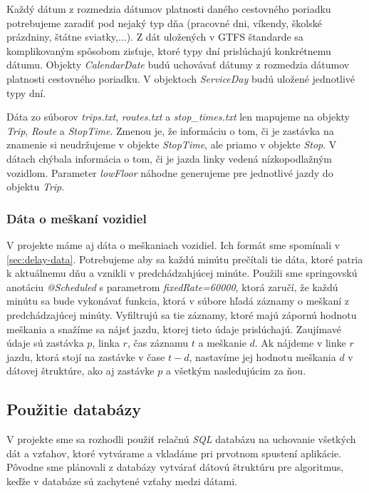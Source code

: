 Každý dátum z rozmedzia dátumov platnosti daného cestovného poriadku potrebujeme zaradiť pod nejaký typ dňa (pracovné dni, víkendy, školské prázdniny, štátne sviatky,...). Z dát uložených v  GTFS štandarde sa komplikovaným spôsobom zisťuje, ktoré typy dní prislúchajú konkrétnemu dátumu. Objekty \textit{CalendarDate} budú uchovávať dátumy z rozmedzia dátumov platnosti cestovného poriadku. V objektoch \textit{ServiceDay} budú uložené jednotlivé typy dní. 

Dáta zo súborov \textit{trips.txt}, \textit{routes.txt} a \textit{stop\_times.txt} len mapujeme na objekty \textit{Trip}, \textit{Route} a \textit{StopTime}. Zmenou je, že informáciu o tom, či je zastávka na znamenie si neudržujeme v objekte \textit{StopTime}, ale priamo v objekte \textit{Stop}. V dátach chýbala informácia o tom, či je jazda linky vedená nízkopodlažným vozidlom. Parameter \textit{lowFloor} náhodne generujeme pre jednotlivé jazdy do objektu \textit{Trip}.

\subsubsection{Dáta o meškaní vozidiel}
V projekte máme aj dáta o meškaniach vozidiel. Ich formát sme spomínali v \ref{sec:delay-data}. Potrebujeme aby sa každú minútu prečítali tie dáta, ktoré patria k aktuálnemu dňu a vznikli v predchádzahjúcej minúte. Použili sme springovskú anotáciu \textit{@Scheduled} s parametrom \textit{fixedRate=60000}, ktorá zaručí, že každú minútu sa bude vykonávať funkcia, ktorá v súbore hľadá záznamy o meškaní z predchádzajúcej minúty. Vyfiltrujú sa tie záznamy, ktoré majú zápornú hodnotu meškania a snažíme sa nájsť jazdu, ktorej tieto údaje prislúchajú. Zaujímavé údaje sú zastávka $p$, linka $r$, čas záznamu $t$ a meškanie $d$. Ak nájdeme v linke $r$ jazdu, ktorá stojí na zastávke v čase $t-d$, nastavíme jej hodnotu meškania $d$ v dátovej štruktúre, ako aj zastávke $p$ a všetkým  nasledujúcim za ňou.

\subsection{Použitie databázy}
V projekte sme sa rozhodli použiť relačnú \textit{SQL} databázu na uchovanie všetkých dát a vzťahov, ktoré vytvárame a vkladáme pri prvotnom spustení aplikácie. Pôvodne sme plánovali z databázy vytvárať dátovú štruktúru pre algoritmus, keďže v databáze sú zachytené vzťahy medzi dátami.

